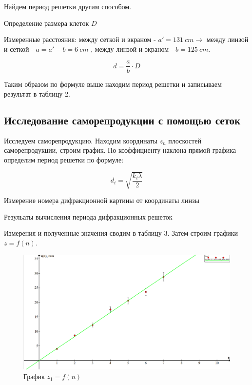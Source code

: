 \documentclass[15pt,a5paper,reqno]{article}
\begin{document}
Найдем период решетки другим способом.
 
\begin{table}[h!]
	\centering
	
	\caption{Определение размера клеток $D$}
	\label{nu1}
\end{table}


Измеренные расстояния: между сеткой и экраном - $a' = 131 \: cm \rightarrow$ между линзой и сеткой -  $a = a' - b = 6 \: cm$ , между линзой и экраном - $ b= 125\:cm$.

\[    d = \frac{a}{b} \cdot D   \]

Таким образом по формуле выше находим период решетки и записываем результат в таблицу 2. 


\subsection{Исследование саморепродукции с помощью сеток}

Исследуем саморепродукцию.
Находим координаты $z_n$ плоскостей саморепродукции, строим график. По коэффициенту наклона прямой графика определим период решетки по формуле:

\begin{equation}
  d_i = \sqrt{\frac{k_i\lambda}{2}}
\end{equation}


\begin{table}[h!]
	\centering
	
	\caption{Измерение номера дифракционной картины от координаты линзы}
	\label{nu1}
\end{table}

\begin{table}[h!]
	\centering
	
	\caption{Резульаты вычисления периода дифракционных решеток}
	\label{nu1}
\end{table}

Измерения и полученные значения сводим в таблицу 3. 
Затем строим графики $z = f(n)$.


\begin{figure}[h!]
  \centering
  \includegraphics[width=13cm]{pics/lab_436_1.png}
  \caption{График $z_1 = f(n)$}
  \label{}
\end{figure}
\end{document}
